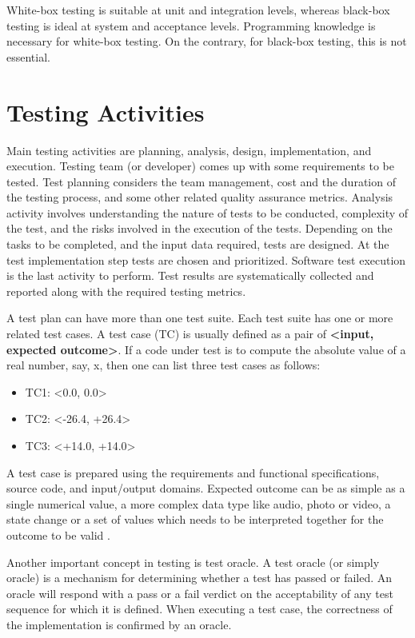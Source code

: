 White-box testing is suitable at unit and integration levels, whereas black-box testing is ideal at system and acceptance levels. Programming knowledge is necessary for white-box testing. On the contrary, for black-box testing, this is not essential.

\section{Testing Activities}
Main testing activities are planning, analysis, design, implementation, and  execution.  Testing team (or developer) comes up with some requirements to be tested. Test planning considers the team management, cost and the duration of the testing process, and some other related quality assurance metrics. Analysis activity involves understanding the nature of tests to be conducted, complexity of the test, and the risks involved in the execution of the tests. Depending on the tasks to be completed, and the input data required, tests are designed. At the test implementation step tests are chosen and prioritized. Software test execution is the last activity to perform. Test results are systematically collected and reported along with the required testing metrics.

A test plan can have more than one test suite. Each test suite has one or more related test cases. A test case (TC) is usually defined as a pair of \textbf{<input, expected outcome>}. If a code under test is to compute the absolute value of a real number, say, x, then one can list three test cases as follows:
\begin{itemize}[nosep]
    \item TC1: <0.0, 0.0>
    \item TC2: <-26.4, +26.4>
    \item TC3: <+14.0, +14.0>
\end{itemize}
A test case is prepared using the requirements and functional specifications, source code, and input/output domains. Expected outcome can be as simple as a single numerical value, a more complex data type like audio, photo or video, a state change or a set of values which needs to be interpreted together for the outcome to be valid \autocite{naik2011software}.

Another important concept in testing is test oracle. A test oracle (or simply oracle) is a mechanism for determining whether a test has passed or failed. An oracle will respond with a pass or a fail verdict on the acceptability of any test sequence for which it is defined. When executing a test case, the correctness of the implementation is confirmed by an oracle.


